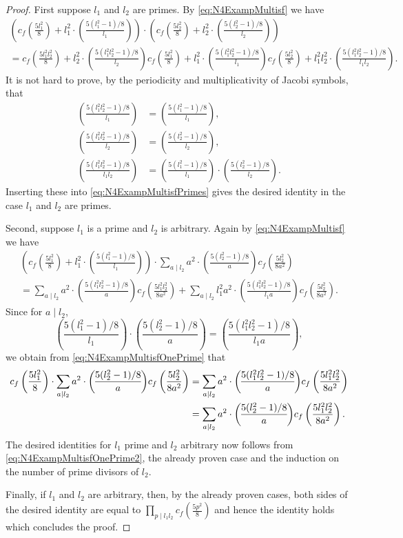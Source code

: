 \documentclass[12pt]{amsart}
\numberwithin{equation}{section}
\theoremstyle{plain}
\theoremstyle{definition}
\theoremstyle{remark}
\newcommand\legendre[2]{\genfrac{(}{)}{}{}{#1}{#2}}
\begin{document}
\begin{proof}
First suppose $l_1$ and $l_2$ are primes. By \eqref{eq:N4ExampMultisf} we have
\begin{multline}
\label{eq:N4ExampMultisfPrimes}
\left(c_f\left(\frac{5l_1^2}{8}\right)+l_1^2\cdot\legendre{5(l_1^2-1)/8}{l_1}\right)\cdot\left(c_f\left(\frac{5l_2^2}{8}\right)+l_2^2\cdot\legendre{5(l_2^2-1)/8}{l_2}\right)\\
=c_f\left(\frac{5l_1^2l_2^2}{8}\right)+l_2^2\cdot\legendre{5(l_1^2l_2^2-1)/8}{l_2}c_f\left(\frac{5l_1^2}{8}\right)+l_1^2\cdot\legendre{5(l_1^2l_2^2-1)/8}{l_1}c_f\left(\frac{5l_2^2}{8}\right)+l_1^2l_2^2\cdot\legendre{5(l_1^2l_2^2-1)/8}{l_1l_2}.
\end{multline}
It is not hard to prove, by the periodicity and multiplicativity of Jacobi symbols, that
\begin{align*}
\legendre{5(l_1^2l_2^2-1)/8}{l_1}&=\legendre{5(l_1^2-1)/8}{l_1},\\
\legendre{5(l_1^2l_2^2-1)/8}{l_2}&=\legendre{5(l_2^2-1)/8}{l_2},\\
\legendre{5(l_1^2l_2^2-1)/8}{l_1l_2}&=\legendre{5(l_1^2-1)/8}{l_1}\cdot\legendre{5(l_2^2-1)/8}{l_2}.
\end{align*}
Inserting these into \eqref{eq:N4ExampMultisfPrimes} gives the desired identity in the case $l_1$ and $l_2$ are primes.

Second, suppose $l_1$ is a prime and $l_2$ is arbitrary. Again by \eqref{eq:N4ExampMultisf} we have
\begin{multline}
\label{eq:N4ExampMultisfOnePrime}
\left(c_f\left(\frac{5l_1^2}{8}\right)+l_1^2\cdot\legendre{5(l_1^2-1)/8}{l_1}\right)\cdot\sum_{a\mid l_2}a^2\cdot\legendre{5(l_2^2-1)/8}{a}c_f\left(\frac{5l_2^2}{8a^2}\right)\\
=\sum_{a\mid l_2}a^2\cdot\legendre{5(l_1^2l_2^2-1)/8}{a}c_f\left(\frac{5l_1^2l_2^2}{8a^2}\right)+\sum_{a\mid l_2}l_1^2a^2\cdot\legendre{5(l_1^2l_2^2-1)/8}{l_1a}c_f\left(\frac{5l_2^2}{8a^2}\right).
\end{multline}
Since for $a\mid l_2$,
$$
\legendre{5(l_1^2-1)/8}{l_1}\cdot\legendre{5(l_2^2-1)/8}{a}=\legendre{5(l_1^2l_2^2-1)/8}{l_1a},
$$
we obtain from \eqref{eq:N4ExampMultisfOnePrime} that
\begin{align}
c_f\left(\frac{5l_1^2}{8}\right)\cdot\sum_{a\mid l_2}a^2\cdot\legendre{5(l_2^2-1)/8}{a}c_f\left(\frac{5l_2^2}{8a^2}\right)&=\sum_{a\mid l_2}a^2\cdot\legendre{5(l_1^2l_2^2-1)/8}{a}c_f\left(\frac{5l_1^2l_2^2}{8a^2}\right)\notag\\
&=\sum_{a\mid l_2}a^2\cdot\legendre{5(l_2^2-1)/8}{a}c_f\left(\frac{5l_1^2l_2^2}{8a^2}\right).
\label{eq:N4ExampMultisfOnePrime2}
\end{align}
The desired identities for $l_1$ prime and $l_2$ arbitrary now follows from \eqref{eq:N4ExampMultisfOnePrime2}, the already proven case and the induction on the number of prime divisors of $l_2$.

Finally, if $l_1$ and $l_2$ are arbitrary, then, by the already proven cases, both sides of the desired identity are equal to $\prod_{p\mid l_1l_2}c_f\left(\frac{5p^2}{8}\right)$ and hence the identity holds which concludes the proof.
\end{proof}
\end{document}
